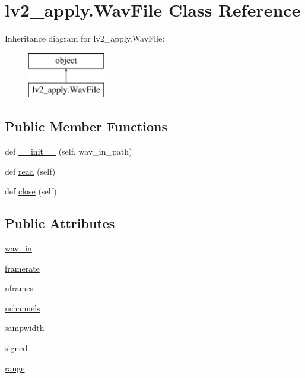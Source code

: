 \hypertarget{classlv2__apply_1_1_wav_file}{}\section{lv2\+\_\+apply.\+Wav\+File Class Reference}
\label{classlv2__apply_1_1_wav_file}
Inheritance diagram for lv2\+\_\+apply.\+Wav\+File\+:\begin{figure}[H]
\begin{center}
\leavevmode
\includegraphics[height=2.000000cm]{classlv2__apply_1_1_wav_file}
\end{center}
\end{figure}
\subsection*{Public Member Functions}
\begin{DoxyCompactItemize}
\item 
def \hyperlink{classlv2__apply_1_1_wav_file_a48dab150eebea949e33aa1dc85aa3e1b}{\+\_\+\+\_\+init\+\_\+\+\_\+} (self, wav\+\_\+in\+\_\+path)
\item 
def \hyperlink{classlv2__apply_1_1_wav_file_a5d28c95de14fc631c923cf6889f60b21}{read} (self)
\item 
def \hyperlink{classlv2__apply_1_1_wav_file_a7cdbe58a9eef42b1fd26f31ebd783edd}{close} (self)
\end{DoxyCompactItemize}
\subsection*{Public Attributes}
\begin{DoxyCompactItemize}
\item 
\hyperlink{classlv2__apply_1_1_wav_file_afbb6a186dc6834e3db200b3ff2da5658}{wav\+\_\+in}
\item 
\hyperlink{classlv2__apply_1_1_wav_file_afcb1bf405d16cbd6c50aa5f534e63ead}{framerate}
\item 
\hyperlink{classlv2__apply_1_1_wav_file_a1c437029a8ef9652691008f4d6dee064}{nframes}
\item 
\hyperlink{classlv2__apply_1_1_wav_file_aa87c952fd08bc0412202ce389b5c5c96}{nchannels}
\item 
\hyperlink{classlv2__apply_1_1_wav_file_ad0ceb2241db29885bb204756c6f5a31e}{sampwidth}
\item 
\hyperlink{classlv2__apply_1_1_wav_file_a1968c0fb6621707d571bc0dafc3efe18}{signed}
\item 
\hyperlink{classlv2__apply_1_1_wav_file_a4cc4a606a1d8bfdf6aa236dee7cb3eb7}{range}
\end{DoxyCompactItemize}
